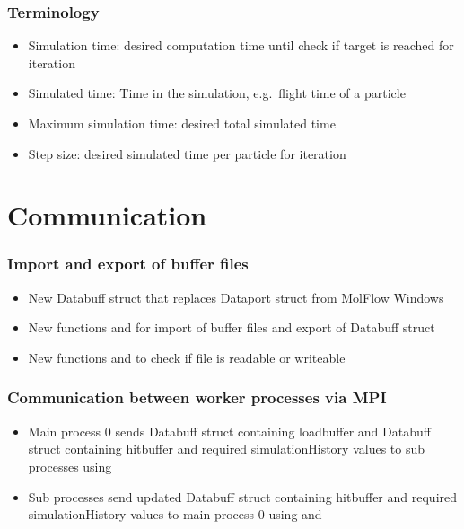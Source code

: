 \subsubsection{Terminology}
\begin{itemize}[noitemsep,topsep=0pt, partopsep=0pt]
\item Simulation time: desired computation time until check if target is reached for iteration
\item Simulated time: Time in the simulation, e.g.\ flight time of a particle
\item Maximum simulation time: desired total simulated time
\item Step size: desired simulated time per particle for iteration
\end{itemize}

\section{Communication}
\subsubsection{Import and export of buffer files}
\begin{itemize}[noitemsep,topsep=0pt, partopsep=0pt]
\item New Databuff struct that replaces Dataport struct from MolFlow Windows 
\item New functions  and  for import of buffer files and export of Databuff struct
\item New functions  and  to check if file is readable or writeable
\end{itemize}

\subsubsection{Communication between worker processes via MPI}
\begin{itemize}[noitemsep,topsep=0pt, partopsep=0pt]
\item Main process 0 sends Databuff struct containing loadbuffer and Databuff struct containing hitbuffer and required simulationHistory values to sub processes using 
\item Sub processes send updated Databuff struct containing hitbuffer and required simulationHistory values to main process 0 using  and 
\end{itemize}

